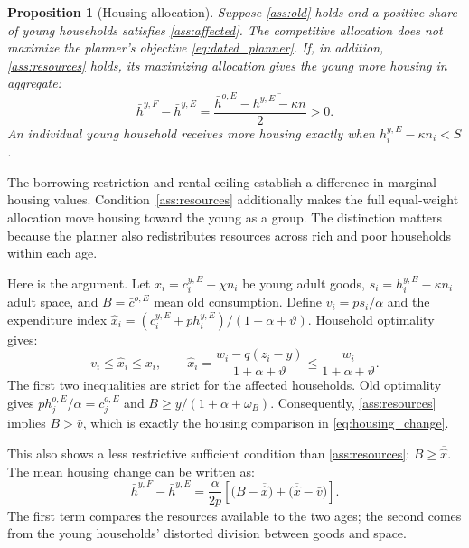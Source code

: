 \documentclass[11pt]{article}
\newtheorem{proposition}{Proposition}
\newcommand{\avg}[1]{\overline{#1}}
\begin{document}
\begin{proposition}[Housing allocation]\label{prop:housing}
Suppose \eqref{ass:old} holds and a positive share of young households satisfies
\eqref{ass:affected}. The competitive allocation does not maximize the
planner's objective \eqref{eq:dated_planner}. If, in addition,
\eqref{ass:resources} holds, its maximizing allocation gives the young more
housing in aggregate:
\begin{equation}
\bar h^{y,F}-\bar h^{y,E}
 =\frac{\bar h^{o,E}-\avg{h^{y,E}-\kappa n}}{2}>0.
\label{eq:housing_change}
\end{equation}
An individual young household receives more housing exactly when
$h_i^{y,E}-\kappa n_i<S$.
\end{proposition}

The borrowing restriction and rental ceiling establish a difference in
marginal housing values. Condition~\eqref{ass:resources} additionally makes
the full equal-weight allocation move housing toward the young as a group.
The distinction matters because the planner also redistributes resources
across rich and poor households within each age.

Here is the argument. Let $x_i=c_i^{y,E}-\chi n_i$ be young adult goods,
$s_i=h_i^{y,E}-\kappa n_i$ adult space, and $B=\bar c^{o,E}$ mean old
consumption. Define $v_i=ps_i/\alpha$ and the expenditure index
$\widehat x_i=(c_i^{y,E}+ph_i^{y,E})/(1+\alpha+\vartheta)$. Household optimality gives:
\begin{equation}
v_i\le\widehat x_i\le x_i,\qquad
\widehat x_i=\frac{w_i-q(z_i-y)}{1+\alpha+\vartheta}\le\frac{w_i}{1+\alpha+\vartheta}.
\label{eq:comparison_chain}
\end{equation}
The first two inequalities are strict for the affected households. Old
optimality gives $ph_j^{o,E}/\alpha=c_j^{o,E}$ and $B\ge y/(1+\alpha+\omega_B)$.
Consequently, \eqref{ass:resources} implies $B>\bar v$, which is exactly
the housing comparison in \eqref{eq:housing_change}.

This also shows a less restrictive sufficient condition than
\eqref{ass:resources}: $B\ge\avg{\widehat x}$. The mean housing change can
be written as:
\begin{equation}
\bar h^{y,F}-\bar h^{y,E}
 =\frac{\alpha}{2p}
   \left[\bigl(B-\avg{\widehat x}\bigr)
          +\bigl(\avg{\widehat x}-\bar v\bigr)\right].
\label{eq:housing_decomposition}
\end{equation}
The first term compares the resources available to the two ages; the second
comes from the young households' distorted division between goods and space.
\end{document}
